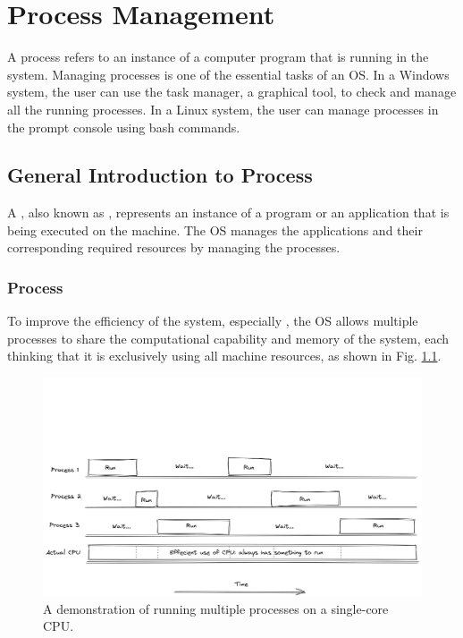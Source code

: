 \chapter{Process Management} \label{ch:pm}

A process refers to an instance of a computer program that is running in the system. Managing processes is one of the essential tasks of an OS. In a Windows system, the user can use the task manager, a graphical tool, to check and manage all the running processes. In a Linux system, the user can manage processes in the prompt console using bash commands.

\section{General Introduction to Process}

A , also known as , represents an instance of a program or an application that is being executed on the machine. The OS manages the applications and their corresponding required resources by managing the processes.
\subsection{Process}

To improve the efficiency of the system, especially , the OS allows multiple processes to share the computational capability and memory of the system, each thinking that it is exclusively using all machine resources, as shown in Fig. \ref{ch:pm:fig:processflow}.

\begin{figure}[!htb]
	\centering
	\includegraphics[width=350pt]{chapters/part-1/figures/processflow.png}
	\caption{A demonstration of running multiple processes on a single-core CPU.} \label{ch:pm:fig:processflow}
\end{figure}

